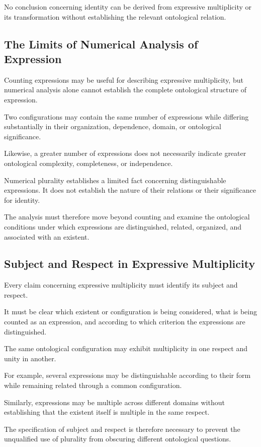 No conclusion concerning identity can be
derived from expressive multiplicity or
its transformation without establishing
the relevant ontological relation.

\subsection{The Limits of Numerical Analysis of Expression}

Counting expressions may be useful for
describing expressive multiplicity, but
numerical analysis alone cannot establish
the complete ontological structure of
expression.

Two configurations may contain the same
number of expressions while differing
substantially in their organization,
dependence, domain, or ontological significance.

Likewise, a greater number of expressions
does not necessarily indicate greater
ontological complexity, completeness,
or independence.

Numerical plurality establishes a limited
fact concerning distinguishable expressions.
It does not establish the nature of their
relations or their significance for identity.

The analysis must therefore move beyond
counting and examine the ontological
conditions under which expressions are
distinguished, related, organized, and
associated with an existent.

\subsection{Subject and Respect in Expressive Multiplicity}

Every claim concerning expressive multiplicity
must identify its subject and respect.

It must be clear which existent or configuration
is being considered, what is being counted
as an expression, and according to which
criterion the expressions are distinguished.

The same ontological configuration may
exhibit multiplicity in one respect and
unity in another.

For example, several expressions may be
distinguishable according to their form
while remaining related through a common
configuration.

Similarly, expressions may be multiple
across different domains without establishing
that the existent itself is multiple in
the same respect.

The specification of subject and respect
is therefore necessary to prevent the
unqualified use of plurality from obscuring
different ontological questions.

